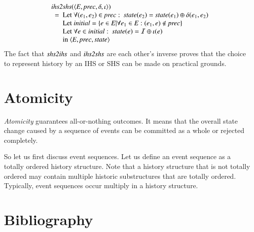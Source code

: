 \documentclass{elsarticle}
\def\id#1{\text{\em #1\/}}
\def\Events{{\mathit E}}
\begin{document}
\begin{eqnarray}
&&\begin{array}{l}
	\id{ihs2shs}(\la\Events, \id{prec}, \delta, \iota\ra)\\
	\ \ =\ \begin{array}[t]{@{}l}
		\text{Let }\forall(e_1,e_2)\in\id{prec}:\ \id{state}(e_2)=\id{state}(e_1)\oplus\delta(e_1,e_2)\\
		\text{Let }\id{initial}=\{e\in\Events|\forall e_1\in\Events: (e_1,e)\notin\id{prec}\}\\
		\text{Let }\forall e\in\id{initial}:\ \id{state}(e)=\mathcal I\oplus\iota(e)\\
		\text{in }\la\Events, \id{prec}, \id{state}\ra
		\end{array}
\end{array}
\label{req:ihs2shs}
\end{eqnarray}
	The fact that $\id{shs2ihs}$ and $\id{ihs2shs}$ are each other's inverse proves that the choice to represent
	history by an IHS or SHS can be made on practical grounds.

\section{Atomicity}
\label{sct:Atomicity}
	{\em Atomicity} guarantees all-or-nothing outcomes.
	It means that the overall state change caused by a sequence of events can be committed as a whole or rejected completely.

	So let us first discuss event sequences.
	Let us define an event sequence as a totally ordered history structure.
	Note that a history structure that is not totally ordered may contain multiple historic substructures
	that are totally ordered.
	Typically, event sequences occur multiply in a history structure.


\section{Bibliography}


\end{document}
